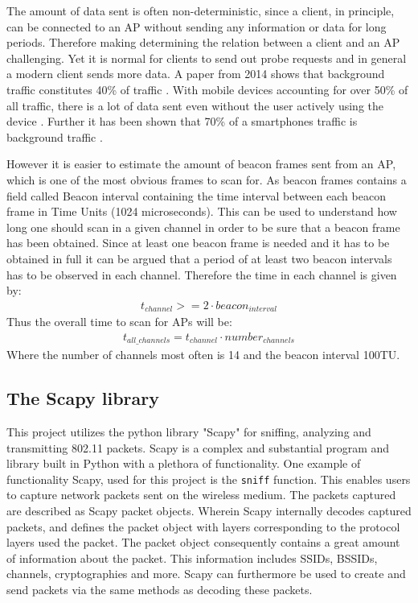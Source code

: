 The amount of data sent is often non-deterministic, since a client, in principle, can be connected to an AP without sending any information or data for long periods. Therefore making determining the relation between a client and an AP challenging. Yet it is normal for clients to send out probe requests and in general a modern client sends more data. A paper from 2014 shows that background traffic constitutes 40\% of traffic \cite{utility}. With mobile devices accounting for over 50\% of all traffic, there is a lot of data sent even without the user actively using the device \cite{stats_mobile}. Further it has been shown that 70\% of a smartphones traffic is background traffic \cite{background_traffic}.

However it is easier to estimate the amount of beacon frames sent from an AP, which is one of the most obvious frames to scan for. As beacon frames contains a field called Beacon interval containing the time interval between each beacon frame in Time Units (1024 microseconds). This can be used to understand how long one should scan in a given channel in order to be sure that a beacon frame has been obtained.
Since at least one beacon frame is needed and it has to be obtained in full it can be argued that a period of at least two beacon intervals has to be observed in each channel. Therefore the time in each channel is given by:
\begin{align}
    t_{channel} >= 2\cdot beacon_{interval}
    \label{tchannel}
\end{align}
Thus the overall time to scan for APs will be:
\begin{align}
    t_{all\_channels} = t_{channel}\cdot number_{channels}
    \label{tallchannels}
\end{align}
Where the number of channels most often is 14 and the beacon interval 100TU.

\subsection{The Scapy library}
This project utilizes the python library "Scapy" for sniffing, analyzing and transmitting 802.11 packets. Scapy is a complex and substantial program and library built in Python with a plethora of functionality. One example of functionality Scapy, used for this project is the \lstinline{sniff} function. This enables users to capture network packets sent on the wireless medium. 
The packets captured are described as Scapy packet objects. Wherein Scapy internally decodes captured packets, and defines the packet object with layers corresponding to the protocol layers used the packet. The packet object consequently contains a great amount of information about the packet. This information includes SSIDs, BSSIDs, channels, cryptographies and more. 
Scapy can furthermore be used to create and send packets via the same methods as decoding these packets. 

